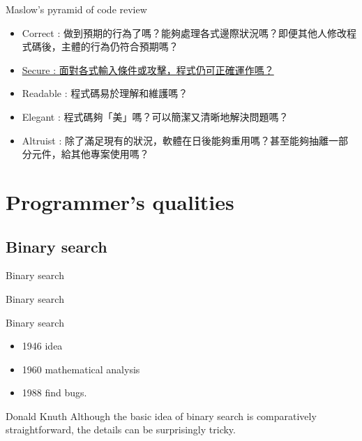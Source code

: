 \documentclass{beamer}
\begin{document}
\begin{CJK*}{UTF8}{bsmi}
    \begin{frame}{Maslow’s pyramid of code review}
        \begin{itemize}
            \item  Correct  : 做到預期的行為了嗎？能夠處理各式邊際狀況嗎？即便其他人修改程式碼後，主體的行為仍符合預期嗎？
            \item  \underline{Secure : 面對各式輸入條件或攻擊，程式仍可正確運作嗎？}
            \item  Readable : 程式碼易於理解和維護嗎？
            \item  Elegant  : 程式碼夠「美」嗎？可以簡潔又清晰地解決問題嗎？
            \item  Altruist : 除了滿足現有的狀況，軟體在日後能夠重用嗎？甚至能夠抽離一部分元件，給其他專案使用嗎？
        \end{itemize}
    \end{frame}

    \section{Programmer's qualities}
    \subsection{Binary search}
    \begin{frame}{Binary search}
        
    \end{frame}

    \begin{frame}{Binary search}
        
    \end{frame}

    \begin{frame}{Binary search}
        \begin{itemize}
            \item 1946 idea
            \item 1960 mathematical analysis
            \item 1988 find bugs.
        \end{itemize}
        \begin{block}{Donald Knuth}
            Although the basic idea of binary search is comparatively straightforward, the details can be surprisingly tricky.
        \end{block}
    \end{frame}


\end{CJK*}
\end{document}
